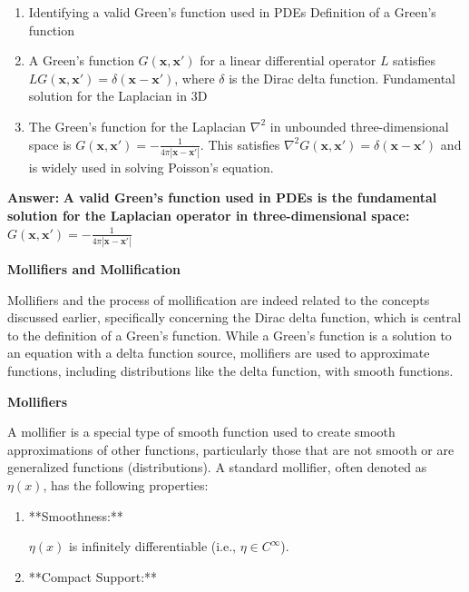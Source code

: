 \documentclass[12pt,a4paper]{report}
\begin{document}
{\begin{description}
\begin{enumerate}
\item Identifying a valid Green's function used in PDEs
Definition of a Green's function
\item A Green's function \(G(\mathbf{x}, \mathbf{x}')\) for a linear differential operator \(L\) satisfies \(L G(\mathbf{x}, \mathbf{x}') = \delta(\mathbf{x} - \mathbf{x}')\), where \(\delta\) is the Dirac delta function.
Fundamental solution for the Laplacian in 3D
\item The Green's function for the Laplacian \(\nabla^2\) in unbounded three-dimensional space is \(G(\mathbf{x}, \mathbf{x}') = -\frac{1}{4\pi |\mathbf{x} - \mathbf{x}'|}\). This satisfies \(\nabla^2 G(\mathbf{x}, \mathbf{x}') = \delta(\mathbf{x} - \mathbf{x}')\) and is widely used in solving Poisson's equation.

\end{enumerate}
\textbf{Answer:} \textbf{A valid Green's function used in PDEs is the fundamental solution for the Laplacian operator in three-dimensional space: \(G(\mathbf{x}, \mathbf{x}') = -\frac{1}{4\pi |\mathbf{x} - \mathbf{x}'|}\)}

\end{description}

\newpage
\textbf{\Large{Mollifiers and Mollification}}

Mollifiers and the process of mollification are indeed related to the concepts discussed earlier, specifically concerning the Dirac delta function, which is central to the definition of a Green's function. While a Green's function is a solution to an equation with a delta function source, mollifiers are used to approximate functions, including distributions like the delta function, with smooth functions.

\begin{description}
\item \textbf{Mollifiers}

A mollifier is a special type of smooth function used to create smooth approximations of other functions, particularly those that are not smooth or are generalized functions (distributions). A standard mollifier, often denoted as \(\eta(x)\), has the following properties:

\begin{enumerate}

\item  **Smoothness:** 

\(\eta(x)\) is infinitely differentiable (i.e., \(\eta \in C^\infty\)).
\item **Compact Support:** 


\end{enumerate}
\end{description}}
\end{document}

